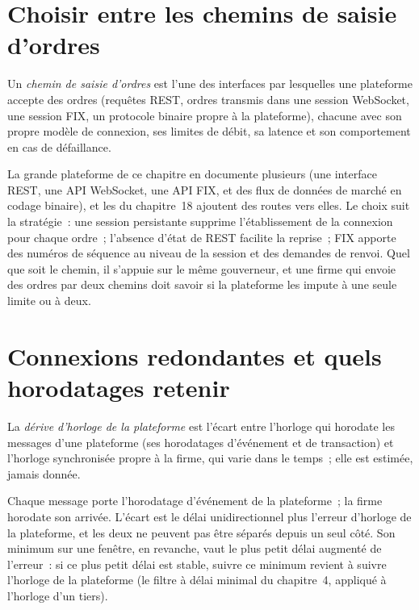\section{Choisir entre les chemins de saisie d'ordres}

\begin{definition}\label{def:nw:api-engineering-for-crypto-venues:path}
Un \emph{chemin de saisie d'ordres} est l'une des interfaces par lesquelles une plateforme accepte des ordres (requêtes REST, ordres transmis
dans une session WebSocket, une session FIX, un protocole binaire propre à la plateforme), chacune avec son propre modèle de connexion, ses limites de débit, sa latence et son comportement en cas de défaillance.
\end{definition}

La grande plateforme de ce chapitre en documente plusieurs (une interface REST, une API WebSocket, une API FIX, et des flux de données de marché en
codage binaire), et les  du chapitre~18 ajoutent des routes vers elles. Le choix suit la stratégie~: une session persistante supprime l'établissement de la connexion
pour chaque ordre~; l'absence d'état de REST facilite la reprise~; FIX apporte des numéros de séquence au niveau de la session et des demandes de renvoi. Quel que soit le chemin, il s'appuie
sur le même gouverneur, et une firme qui envoie des ordres par deux chemins doit savoir si la plateforme les impute à une seule limite ou à deux.

\section{Connexions redondantes et quels horodatages retenir}

\begin{definition}\label{def:nw:api-engineering-for-crypto-venues:skew}
La \emph{dérive d'horloge de la plateforme} est l'écart entre l'horloge qui horodate les messages d'une plateforme (ses horodatages d'événement et de transaction)
et l'horloge synchronisée propre à la firme, qui varie dans le temps~; elle est estimée, jamais donnée.
\end{definition}

Chaque message porte l'horodatage d'événement de la plateforme~; la firme horodate son arrivée. L'écart est le délai unidirectionnel plus l'erreur d'horloge de la plateforme, et les
deux ne peuvent pas être séparés depuis un seul côté. Son minimum sur une fenêtre, en revanche, vaut le plus petit délai augmenté de l'erreur~: si ce plus petit délai est stable,
suivre ce minimum revient à suivre l'horloge de la plateforme (le filtre à délai minimal du chapitre~4, appliqué à l'horloge d'un tiers).

